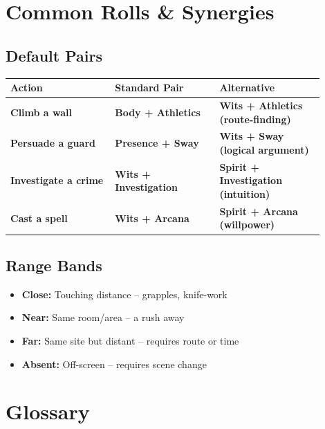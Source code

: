 \documentclass[10pt,twocolumn]{article}
\begin{document}
\section{Common Rolls \& Synergies}

\subsection{Default Pairs}
\begin{coretable}
\begin{tabular}{>{\bfseries}p{0.3\linewidth} >{\bfseries}p{0.3\linewidth} >{\bfseries}p{0.3\linewidth}}
\toprule
\textbf{Action} & \textbf{Standard Pair} & \textbf{Alternative} \\
\midrule
Climb a wall & Body + Athletics & Wits + Athletics (route-finding) \\
Persuade a guard & Presence + Sway & Wits + Sway (logical argument) \\
Investigate a crime & Wits + Investigation & Spirit + Investigation (intuition) \\
Cast a spell & Wits + Arcana & Spirit + Arcana (willpower) \\
\bottomrule
\end{tabular}
\end{coretable}

\subsection{Range Bands}
\begin{itemize}
    \item \textbf{Close:} Touching distance – grapples, knife-work
    \item \textbf{Near:} Same room/area – a rush away
    \item \textbf{Far:} Same site but distant – requires route or time
    \item \textbf{Absent:} Off-screen – requires scene change
\end{itemize}

\section{Glossary}
\end{document}
